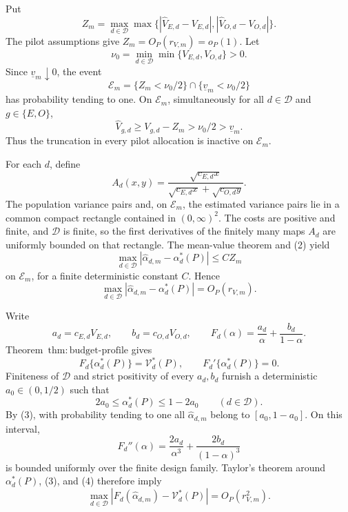 Put
\[
 Z_m=\max_{d\in\mathcal D}\max\bigl\{
 |\widehat V_{E,d}-V_{E,d}|,
 |\widehat V_{O,d}-V_{O,d}|\bigr\}.
\]
The pilot assumptions give \(Z_m=O_P(r_{V,m})=o_P(1)\).  Let
\[
 \nu_0=\min_{d\in\mathcal D}\min\{V_{E,d},V_{O,d}\}>0.
\]
Since \(\underline v_m\downarrow0\), the event
\[
 \mathcal E_m=\{Z_m<\nu_0/2\}\cap\{\underline v_m<\nu_0/2\} \tag{1}
\]
has probability tending to one.  On \(\mathcal E_m\), simultaneously for all \(d\in\mathcal D\) and \(g\in\{E,O\}\),
\[
 \widehat V_{g,d}\ge V_{g,d}-Z_m>\nu_0/2>\underline v_m. \tag{2}
\]
Thus the truncation in every pilot allocation is inactive on \(\mathcal E_m\).

For each \(d\), define
\[
 A_d(x,y)=
 \frac{\sqrt{c_{E,d}x}}
 {\sqrt{c_{E,d}x}+\sqrt{c_{O,d}y}}.
\]
The population variance pairs and, on \(\mathcal E_m\), the estimated variance pairs lie in a common compact rectangle contained in \((0,\infty)^2\).  The costs are positive and finite, and \(\mathcal D\) is finite, so the first derivatives of the finitely many maps \(A_d\) are uniformly bounded on that rectangle.  The mean-value theorem and (2) yield
\[
 \max_{d\in\mathcal D}
 |\widehat\alpha_{d,m}-\alpha_d^*(P)|
 \le C Z_m
\]
on \(\mathcal E_m\), for a finite deterministic constant \(C\).  Hence
\[
 \max_{d\in\mathcal D}
 |\widehat\alpha_{d,m}-\alpha_d^*(P)|
 =O_P(r_{V,m}). \tag{3}
\]

Write
\[
 a_d=c_{E,d}V_{E,d},\qquad b_d=c_{O,d}V_{O,d},\qquad
 F_d(\alpha)=\frac{a_d}{\alpha}+\frac{b_d}{1-\alpha}.
\]
Theorem~\(\mathrm{thm{:}budget\text{-}profile}\) gives
\[
 F_d\{\alpha_d^*(P)\}=\mathcal V_d^*(P),
 \qquad F_d'\{\alpha_d^*(P)\}=0. \tag{4}
\]
Finiteness of \(\mathcal D\) and strict positivity of every \(a_d,b_d\) furnish a deterministic \(a_0\in(0,1/2)\) such that
\[
 2a_0\le\alpha_d^*(P)\le1-2a_0
 \qquad(d\in\mathcal D).
\]
By (3), with probability tending to one all \(\widehat\alpha_{d,m}\) belong to \([a_0,1-a_0]\).  On this interval,
\[
 F_d''(\alpha)=\frac{2a_d}{\alpha^3}
 +\frac{2b_d}{(1-\alpha)^3}
\]
is bounded uniformly over the finite design family.  Taylor's theorem around \(\alpha_d^*(P)\), (3), and (4) therefore imply
\[
 \max_{d\in\mathcal D}
 \left|F_d(\widehat\alpha_{d,m})-\mathcal V_d^*(P)\right|
 =O_P(r_{V,m}^2). \tag{5}
\]

